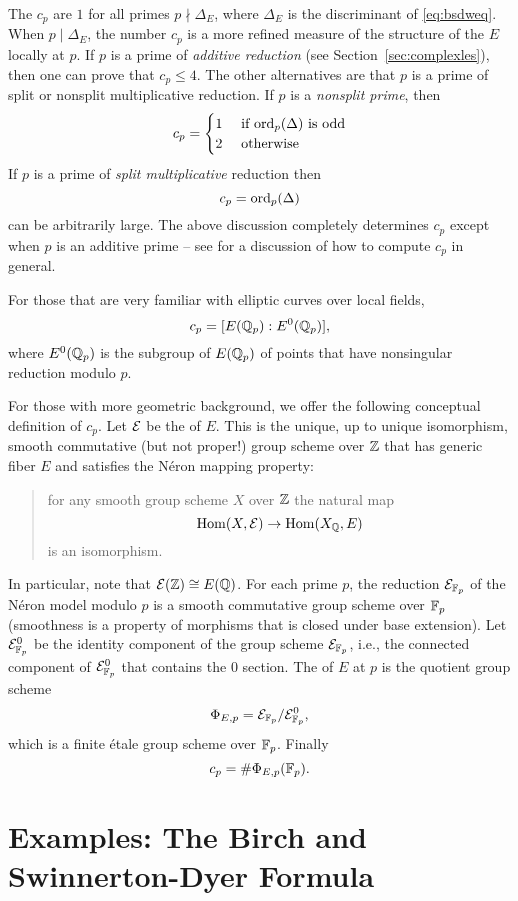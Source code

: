 The  $c_p$ are $1$ for all primes $p\nmid
\Delta_E$, where $\Delta_E$ is the discriminant of \eqref{eq:bsdweq}.
When $p\mid \Delta_E$, the number $c_p$ is a more refined measure
of the structure of the $E$ locally at $p$.  If $p$ is a prime
of {\em additive reduction} (see Section~\ref{sec:complexles}), then
one can prove that $c_p \leq 4$.   The other alternatives are
that $p$ is a prime of split or nonsplit multiplicative reduction.
If $p$ is a {\em nonsplit prime}, then 
$$
  c_p = \begin{cases} 1 & \text{ if $\operatorname{ord}_p(\Delta)$ is odd} \\
                      2 & \text{ otherwise}
\end{cases}
$$  
If $p$ is a prime
of {\em split multiplicative} reduction then 
$$
 c_p = \operatorname{ord}_p(\Delta)
$$
can be arbitrarily large.  The above discussion completely determines
$c_p$ except when $p$ is an additive prime -- see \cite[\S3.2]{cremona:algs}
for a discussion of how to compute $c_p$ in general.

For those that are very familiar with elliptic curves
over local fields, 
$$
 c_p = [E(\mathbb{Q}_p) : E^0(\mathbb{Q}_p)],
$$
where $E^0(\mathbb{Q}_p)$ is the subgroup of $E(\mathbb{Q}_p)$ of points
that have nonsingular reduction modulo $p$.

For those with more geometric background, we offer the following
conceptual definition of $c_p$.  Let $\mathcal{E}$ be the 
of $E$. This is the unique, up to unique isomorphism, smooth
commutative (but not proper!) group scheme over $\mathbb{Z}$ that has
generic fiber $E$ and satisfies the N\'eron mapping property:
\begin{quote}
for any smooth group scheme $X$ over $\mathbb{Z}$ the natural map
$$\operatorname{Hom}(X, \mathcal{E}) \to \operatorname{Hom}(X_{\mathbb{Q}}, E)$$
is an isomorphism.
\end{quote}
In particular, note that $\mathcal{E}(\mathbb{Z}) \cong E(\mathbb{Q})$.
For each prime $p$, the reduction $\mathcal{E}_{\mathbb{F}_p}$ of the N\'eron 
model modulo $p$ is a smooth commutative group
scheme over $\mathbb{F}_p$ (smoothness is a property of morphisms
that is closed under base extension).  Let $\mathcal{E}_{\mathbb{F}_p}^0$
be the identity component of the group scheme $\mathcal{E}_{\mathbb{F}_p}$,
i.e., the connected component of $\mathcal{E}_{\mathbb{F}_p}^0$ that contains
the $0$ section.  The  of $E$ at $p$
is the quotient group scheme
$$
  \Phi_{E,p} = \mathcal{E}_{\mathbb{F}_p} / \mathcal{E}_{\mathbb{F}_p}^0,
$$
which is a finite \'etale group scheme over $\mathbb{F}_p$.
Finally
$$
  c_p = \# \Phi_{E,p}(\mathbb{F}_p).
$$


\section{Examples: The Birch and Swinnerton-Dyer Formula}


